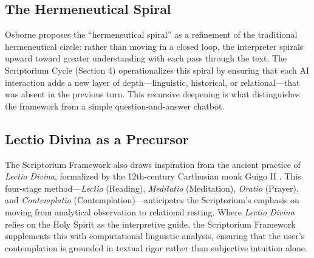 \subsection{The Hermeneutical Spiral}
Osborne \cite{osborne2006} proposes the ``hermeneutical spiral'' as a refinement of the traditional hermeneutical circle: rather than moving in a closed loop, the interpreter spirals upward toward greater understanding with each pass through the text. The Scriptorium Cycle (Section 4) operationalizes this spiral by ensuring that each AI interaction adds a new layer of depth---linguistic, historical, or relational---that was absent in the previous turn. This recursive deepening is what distinguishes the framework from a simple question-and-answer chatbot.

\subsection{Lectio Divina as a Precursor}
The Scriptorium Framework also draws inspiration from the ancient practice of \textit{Lectio Divina}, formalized by the 12th-century Carthusian monk Guigo II \cite{guigo1150}. This four-stage method---\textit{Lectio} (Reading), \textit{Meditatio} (Meditation), \textit{Oratio} (Prayer), and \textit{Contemplatio} (Contemplation)---anticipates the Scriptorium's emphasis on moving from analytical observation to relational resting. Where \textit{Lectio Divina} relies on the Holy Spirit as the interpretive guide, the Scriptorium Framework supplements this with computational linguistic analysis, ensuring that the user's contemplation is grounded in textual rigor rather than subjective intuition alone.

